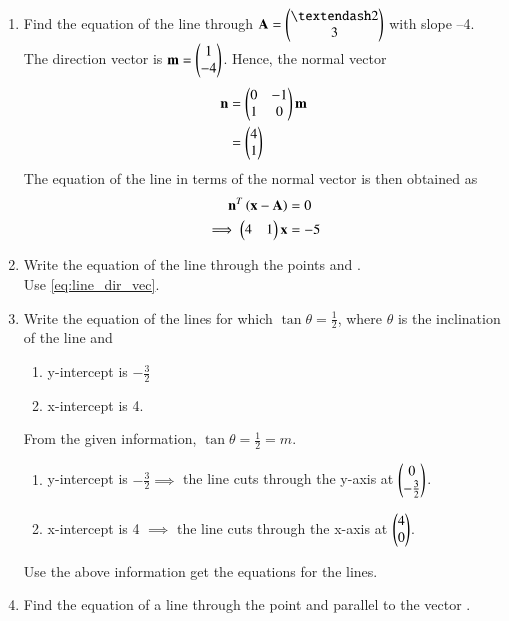 \begin{enumerate}[label=\arabic*.,ref=\thesubsection.\theenumi]
\item Find the equation of the line through $\vec{A}=\myvec{– 2\\ 3}$ with slope –4.
\\
\solution The direction vector is $\mathbf{m} = \begin{pmatrix}1\\-4\end{pmatrix}$.  Hence, the normal vector
\begin{align}
\label{eq:line_norm_dir}
\mathbf{n} &= \begin{pmatrix}0&-1\\1&0\end{pmatrix}\mathbf{m} 
\\
&= \begin{pmatrix}4\\1\end{pmatrix}
\end{align}
%
The equation of the line in terms of the normal vector is then obtained as
\begin{align}
\label{eq:line_norm_vec}
\mathbf{n}^T\left(\mathbf{x}-\mathbf{A}\right) &= 0
\\
\implies \begin{pmatrix}4 & 1\end{pmatrix} \mathbf{x} &= -5
\end{align}
%
\item Write the equation of the line through the points  and .
%
\\
\solution Use \eqref{eq:line_dir_vec}.
\item Write the equation of the lines for which $\tan \theta = \frac{1}{2}$, where $\theta$ is the inclination of the line and 
\label{prob:line_intercept}
\begin{enumerate}
\item y-intercept is $-\frac{3}{2}$
\item x-intercept is 4.
\end{enumerate}
%
\solution From the given information, $\tan \theta = \frac{1}{2}=m $.
\begin{enumerate}
\item y-intercept is $-\frac{3}{2} \implies $ the line cuts through the y-axis at $\begin{pmatrix}0\\-\frac{3}{2}\end{pmatrix}$.
\item x-intercept is 4 $\implies$ the line cuts through the x-axis at $\begin{pmatrix}4\\0\end{pmatrix}$.
\end{enumerate}
%
Use the above information get the equations for the lines.
%
\item Find the equation of a line through the point  and parallel to the vector .

\end{enumerate}
